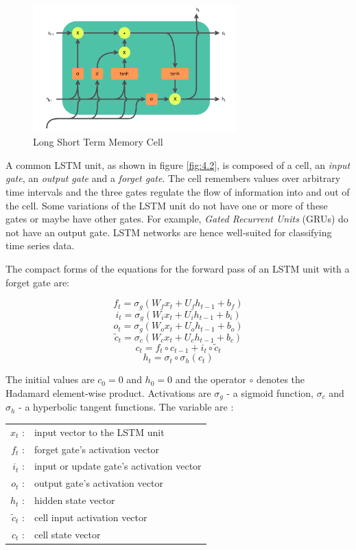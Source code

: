 \documentclass[12pt, a4paper]{report}
\begin{document}
\begin{figure}[!htbp]
    \centering
    \includegraphics[width=0.7\textwidth]{LSTM_cell.png}
    \caption[Long Short Term Memory Cell]{Long Short Term Memory Cell \cite{wiki:lstm}}
    \label{fig:4.2}
\end{figure}

A common LSTM unit, as shown in figure \eqref{fig:4.2}, is composed of a cell, an \emph{input gate}, an \emph{output gate} and a \emph{forget gate}. The cell remembers values over arbitrary time intervals and the three gates regulate the flow of information into and out of the cell. Some variations of the LSTM unit do not have one or more of these gates or maybe have other gates. For example, \emph{Gated Recurrent Units} (GRUs) do not have an output gate. LSTM networks are hence well-suited for classifying time series data.

The compact forms of the equations for the forward pass of an LSTM unit with a forget gate are:

\[f_t = \sigma_g(W_f x_t + U_f h_{t-1} + b_f)\]
\[i_t = \sigma_g(W_i x_t + U_i h_{t-1} + b_i)\]
\[o_t = \sigma_g(W_o x_t + U_o h_{t-1} + b_o)\]
\[\tilde{c}_t = \sigma_c(W_c x_t + U_c h_{t-1} + b_c)\]
\[c_t = f_t \circ c_{t-1} + i_t \circ \tilde{c}_t\]
\begin{equation}
    h_t = \sigma_t \circ \sigma_h(c_t)
\end{equation}

The initial values are $c_0 = 0$ and $h_0 = 0$ and the operator $\circ$ denotes the Hadamard element-wise product. Activations are $\sigma_g$ - a sigmoid function, $\sigma_c$ and $\sigma_h$  - a hyperbolic tangent functions. The variable are \cite{wiki:lstm}:

\begin{table}[h]
    \centering
    \begin{tabular}{ r l }
        $x_t$           : & input vector to the LSTM unit            \\
        $f_t$           : & forget gate's activation vector          \\
        $i_{t}$         : & input or update gate's activation vector \\
        $o_{t}$         : & output gate's activation vector          \\
        $h_{t}$         : & hidden state vector                      \\
        $\tilde{c}_{t}$ : & cell input activation vector             \\
        $c_{t}$         : & cell state vector
    \end{tabular}
\end{table}
\end{document}
